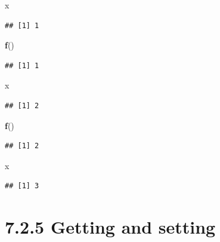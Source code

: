 \documentclass[]{book}
\newenvironment{Shaded}{\begin{snugshade}}{\end{snugshade}}
\newcommand{\KeywordTok}[1]{\textcolor[rgb]{0.13,0.29,0.53}{\textbf{#1}}}
\newcommand{\NormalTok}[1]{#1}
\begin{document}
\begin{Shaded}
\begin{Highlighting}[]
\NormalTok{x}
\end{Highlighting}
\end{Shaded}

\begin{verbatim}
## [1] 1
\end{verbatim}

\begin{Shaded}
\begin{Highlighting}[]
\KeywordTok{f}\NormalTok{()}
\end{Highlighting}
\end{Shaded}

\begin{verbatim}
## [1] 1
\end{verbatim}

\begin{Shaded}
\begin{Highlighting}[]
\NormalTok{x}
\end{Highlighting}
\end{Shaded}

\begin{verbatim}
## [1] 2
\end{verbatim}

\begin{Shaded}
\begin{Highlighting}[]
\KeywordTok{f}\NormalTok{()}
\end{Highlighting}
\end{Shaded}

\begin{verbatim}
## [1] 2
\end{verbatim}

\begin{Shaded}
\begin{Highlighting}[]
\NormalTok{x}
\end{Highlighting}
\end{Shaded}

\begin{verbatim}
## [1] 3
\end{verbatim}

\hypertarget{getting-and-setting}{%
\section*{7.2.5 Getting and setting}\label{getting-and-setting}}
\end{document}
